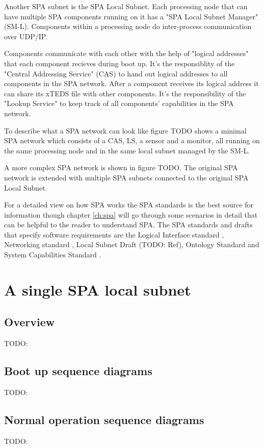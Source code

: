 Another SPA subnet is the SPA Local Subnet. Each processing node that can
have multiple SPA components running on it has a "SPA Local Subnet Manager"
(SM-L).  Components within a processing node do inter-process communication
over UDP/IP.

Components communicate with each other with the help of "logical addresses"
that each component recieves during boot up. It's the responsiblity of the
"Central Addressing Service" (CAS) to hand out logical addresses to all
components in the SPA network. After a component receives its logical address
it can share its xTEDS file with other components. It's the responsibility of
the "Lookup Service" to keep track of all components' capabilities in the SPA
network.

To describe what a SPA network can look like figure TODO shows a minimal SPA
network which consists of a CAS, LS, a sensor and a monitor, all running on the
same processing node and in the same local subnet managed by the SM-L.

A more complex SPA network is shown in figure TODO. The original SPA network is
extended with multiple SPA subnets connected to the original SPA Local Subnet.

For a detailed view on how SPA works the SPA standards is the best source for
information though chapter \ref{ch:spa} will go through some scenarios in
detail that can be helpful to the reader to understand SPA. The SPA standards
and drafts that specify software requirements are the Logical Interface
standard \cite{spa:logical-interface}, Networking standard
\cite{spa:networking}, Local Subnet Draft (TODO: Ref), Ontology Standard
\cite{spa:ontology} and System Capabilities Standard
\cite{spa:system-capabilities}.

\section{A single SPA local subnet}
\subsection{Overview}
TODO:

\subsection{Boot up sequence diagrams}
TODO:

\subsection{Normal operation sequence diagrams}
TODO:

